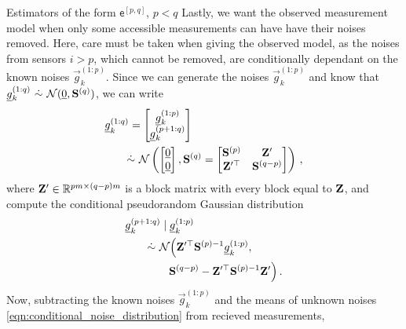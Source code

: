 \documentclass[conference]{IEEEtran}
\theoremstyle{definition}
\theoremstyle{remark}
\begin{document}
\begin{LaTeXdescription}
  \item[Estimators of the form $\mathsf{e}^{[p,q]}$, $p<q$] Lastly, we want the observed measurement model when only some accessible measurements can have have their noises removed. Here, care must be taken when giving the observed model, as the noises from sensors $i>p$, which cannot be removed, are conditionally dependant on the known noises $\vec{g}_k^{(1:p)}$. Since we can generate the noises $\vec{g}_k^{(1:p)}$ and know that $\vec{g}_k^{(1:q)}\ \dot{\sim}\ \mathcal{N}(\vec{0}, \mat{S}^{(q)})$, we can write 
  \begin{equation}\label{eqn:block_noises_and_correlation}
    \begin{split}
      &\vec{g}_k^{(1:q)}=
      \begin{bmatrix}
        \vec{g}_k^{(1:p)}\\
        \vec{g}_k^{(p+1:q)}\\
      \end{bmatrix}\\ 
      &\qquad \dot{\sim}\ \mathcal{N}\left(
      \begin{bmatrix}
        \vec{0}\\
        \vec{0}
      \end{bmatrix},\mat{S}^{(q)}=
      \begin{bmatrix}
        \mat{S}^{(p)} & \mat{Z}^\prime\\
        \mat{Z}^{\prime\top} & \mat{S}^{(q-p)}
      \end{bmatrix}\right)\,,
    \end{split}
  \end{equation}
  where ${{\mathbf{Z}}}^\prime \in \mathbb{R}^{pm \times (q-p)m}$ is a block matrix with every block equal to ${{\mathbf{Z}}}$, and compute the conditional pseudorandom Gaussian distribution
  \begin{equation}\label{eqn:conditional_noise_distribution}
    \begin{split}
      &\vec{g}_k^{(p+1:q)} \mid \vec{g}_k^{(1:p)}\\
      &\qquad \dot{\sim}\ \mathcal{N}\Big(\mat{Z}^{\prime\top}\mat{S}^{(p)-1}\vec{g}_k^{(1:p)},\\
      &\qquad\qquad \mat{S}^{(q-p)} - \mat{Z}^{\prime\top}\mat{S}^{(p)-1}\mat{Z}^{\prime}\Big)\,.
    \end{split}
  \end{equation}
  Now, subtracting the known noises $\vec{g}_k^{(1:p)}$ and the means of unknown noises \eqref{eqn:conditional_noise_distribution} from recieved measurements,

\end{LaTeXdescription}
\end{document}
